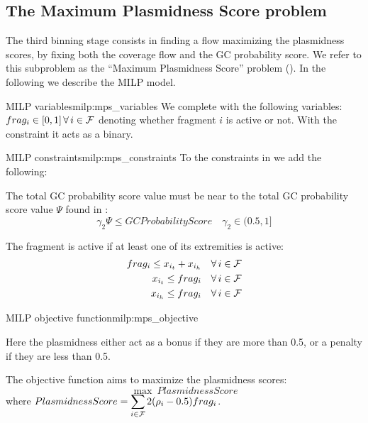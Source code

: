 \subsection{The Maximum Plasmidness Score problem \MPS{}}\label{sec:method:mps}

The third binning stage consists in finding a flow maximizing the plasmidness scores, by fixing both the coverage flow and the GC probability score.
We refer to this subproblem as the \enquote{Maximum Plasmidness Score} problem (\MPS{}).
In the following we describe the MILP model.

\begin{definition}{\MPS{} MILP variables}{milp:mps_variables}
  We complete  with the following variables:
  \(\frag{i} \in [0, 1] \, \forall i \in \Fragments{}\) denoting whether fragment \(i\) is active or not. With the constraint it acts as a binary.
\end{definition}

\begin{definition}{\MGC{} MILP constraints}{milp:mps_constraints}
  To the constraints in  we add the following:

  The total GC probability score value must be near to the total GC probability score value \(\Psi{}\) found in \MGC{}:
  \begin{equation}
    \gamma_2 \Psi \leq GCProbabilityScore \quad \gamma_2 \in (0.5, 1]
  \end{equation}

  The fragment is active if at least one of its extremities is active:
  \begin{align}
    \frag{i} \leq x_{i_t} + x_{i_h} \quad \forall i \in \Fragments{} \\
    x_{i_t} \leq \frag{i} \quad \forall i \in \Fragments{} \\
    x_{i_h} \leq \frag{i} \quad \forall i \in \Fragments{}
  \end{align}
\end{definition}

\begin{definition}{\MGC{} MILP objective function}{milp:mps_objective}
  \begin{newfeatbox}
    Here the plasmidness either act as a bonus if they are more than 0.5, or a penalty if they are less than 0.5.
  \end{newfeatbox}
  The objective function aims to maximize the plasmidness scores:
  \begin{equation}
    \max ~ PlasmidnessScore
  \end{equation}
  where \(\displaystyle PlasmidnessScore = \sum_{i \in \mathcal{F}{}} 2 (\rho_{i} - 0.5)frag_{i}\).
\end{definition}